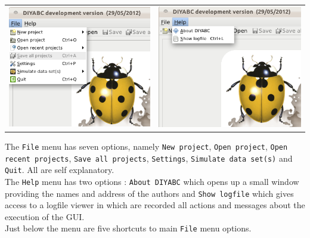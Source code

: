 \begin{center}
\begin{tabular}{cc}
\includegraphics[scale=0.5]{gui_pictures/Capture-DIYABC-2}  & \includegraphics[scale=0.5]{gui_pictures/Capture-DIYABC-3}\tabularnewline
\end{tabular}
\par\end{center}

The \texttt{File} menu has seven options, namely \texttt{New project},
\texttt{Open project}, \texttt{Open recent projects}, \texttt{Save
all projects}, \texttt{Settings}, \texttt{Simulate data set(s)} and
\texttt{Quit}. All are self explanatory.\\
 The \texttt{Help} menu has two options : \texttt{About DIYABC} which
opens up a small window providing the names and address of the authors
and \texttt{Show logfile} which gives access to a logfile viewer in
which are recorded all actions and messages about the execution of
the GUI.\\
 Just below the menu are five shortcuts to main \texttt{File} menu
options.\\


